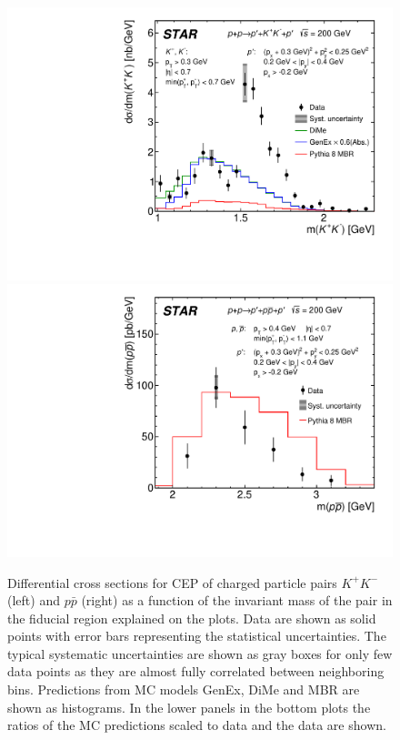 \begin{figure}[h]
\centering
\includegraphics[width=.48\textwidth,page=1]{graphics/physicsResults/FinalResult_InvMass_kaon.pdf}
\includegraphics[width=.48\textwidth,page=1]{graphics/physicsResults/FinalResult_InvMass_proton.pdf}
%
\caption[Differential cross sections for CEP of charged particle pairs $K^+K^-$ and $p\bar{p}$ as a function of the invariant mass of the pair in the fiducial region.]{Differential cross sections for CEP of charged particle pairs $K^+K^-$ (left) and $p\bar{p}$ (right) as a function of the invariant mass of the pair in the fiducial region explained on the plots. Data are shown as solid points with error bars representing the statistical uncertainties. The typical systematic uncertainties are shown as gray boxes for only few data points as they are almost fully correlated between neighboring bins. Predictions from MC models GenEx, DiMe and MBR are shown as histograms. In the lower panels in the bottom plots the ratios of the MC predictions scaled to data and the data are shown.}
\label{results_02}
\end{figure}
% 
